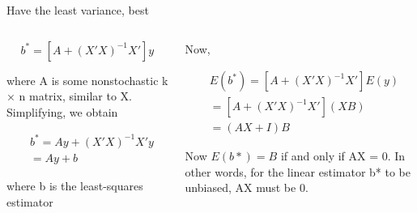 \documentclass[australian,ignorenonframetext,aspectratio=169]{beamer}
\begin{document}
\begin{frame}{Have the least variance, best}
\protect\hypertarget{have-the-least-variance-best}{}

\begin{columns}[T]
\begin{column}{0.5\textwidth}
\[b^*=\left[A+(X'X)^{-1} X \prime\right] y\]

where A is some nonstochastic k × n matrix, similar to X. Simplifying,
we obtain

\[
\begin{aligned}
&b^*=A y+(X'X)^{-1} X'y \\
&=A y+b
\end{aligned}
\]

where b is the least-squares estimator
\end{column}

\begin{column}{0.5\textwidth}
Now,

\[
\begin{aligned}
&E\left(b^*\right)=\left[A+(X'X)^{-1} X'\right] E(y) \\
&=\left[A+(X'X)^{-1} X \prime\right](X B) \\
&=(A X+I) B
\end{aligned}
\]

Now \(E(b*) = B\) if and only if AX = 0. In other words, for the linear
estimator b* to be unbiased, AX must be 0.
\end{column}
\end{columns}

\end{frame}
\end{document}
